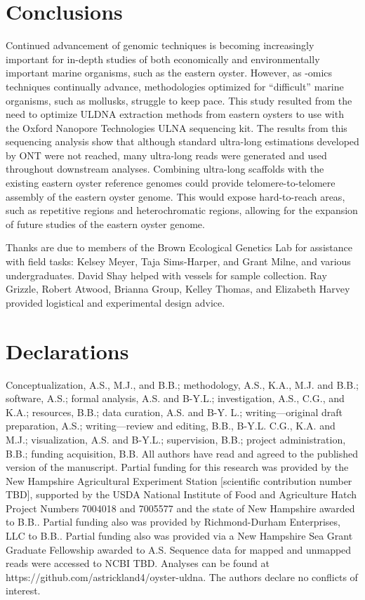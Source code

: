 \documentclass[lineno,referee,pdflatex,sn-basic]{sn-jnl}%
\begin{document}
\section{Conclusions}
Continued advancement of genomic techniques is becoming increasingly important for in-depth studies of both economically and environmentally important marine organisms, such as the eastern oyster. However, as -omics techniques continually advance, methodologies optimized for “difficult” marine organisms, such as mollusks, struggle to keep pace. This study resulted from the need to optimize ULDNA extraction methods from eastern oysters to use with the Oxford Nanopore Technologies ULNA sequencing kit. The results from this sequencing analysis show that although standard ultra-long estimations developed by ONT were not reached, many ultra-long reads were generated and used throughout downstream analyses. Combining ultra-long scaffolds with the existing eastern oyster reference genomes could provide telomere-to-telomere assembly of the eastern oyster genome. This would expose hard-to-reach areas, such as repetitive regions and heterochromatic regions, allowing for the expansion of future studies of the eastern oyster genome.

Thanks are due to members of the Brown Ecological Genetics Lab for assistance with field tasks: Kelsey Meyer, Taja Sims-Harper, and Grant Milne, and various undergraduates. David Shay helped with vessels for sample collection. Ray Grizzle, Robert Atwood, Brianna Group, Kelley Thomas, and Elizabeth Harvey provided logistical and experimental design advice.

\section*{Declarations}
Conceptualization, A.S., M.J., and B.B.; methodology, A.S., K.A., M.J. and B.B.; software, A.S.; formal analysis, A.S. and B-Y.L.; investigation, A.S., C.G., and K.A.; resources, B.B.; data curation, A.S. and B-Y. L.; writing—original draft preparation, A.S.; writing—review and editing, B.B., B-Y.L. C.G., K.A. and M.J.; visualization, A.S. and B-Y.L.; supervision, B.B.; project administration, B.B.; funding acquisition, B.B. All authors have read and agreed to the published version of the manuscript.
Partial funding for this research was provided by the New Hampshire Agricultural Experiment Station [scientific contribution number TBD], supported by the USDA National Institute of Food and Agriculture Hatch Project Numbers 7004018 and 7005577 and the state of New Hampshire awarded to B.B.. Partial funding also was provided by Richmond-Durham Enterprises, LLC to B.B.. Partial funding also was provided via a New Hampshire Sea Grant Graduate Fellowship awarded to A.S.
Sequence data for mapped and unmapped reads were accessed to NCBI TBD. 
Analyses can be found at https://github.com/astrickland4/oyster-uldna.
The authors declare no conflicts of interest.


\end{document}

